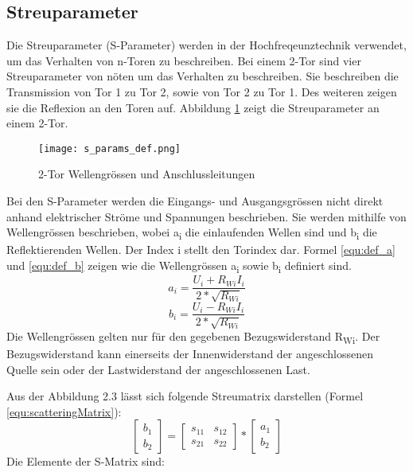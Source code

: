\subsection{Streuparameter}\label{subsec:Streuparameter}
Die Streuparameter (S-Parameter) werden in der Hochfreqeunztechnik verwendet, um das Verhalten von n-Toren zu beschreiben. Bei einem 2-Tor sind vier Streuparameter von nöten um das Verhalten zu beschreiben. Sie beschreiben die Transmission von Tor 1 zu Tor 2, sowie von Tor 2 zu Tor 1. Des weiteren zeigen sie die Reflexion an den Toren auf. Abbildung \ref{fig:2-Tor}  zeigt die Streuparameter an einem 2-Tor. 
\begin{figure}[H]
	\centering
	\texttt{[image: s\_params\_def.png]}
	\caption{2-Tor Wellengrössen und Anschlussleitungen \cite{hftech}}
	\label{fig:2-Tor}
\end{figure}
Bei den S-Parameter werden die Eingangs- und Ausgangsgrössen nicht direkt anhand elektrischer Ströme und Spannungen beschrieben. Sie werden mithilfe von Wellengrössen beschrieben, wobei a\textsubscript{i} die einlaufenden Wellen sind und b\textsubscript{i} die Reflektierenden Wellen. Der Index i stellt den Torindex dar. Formel \ref{equ:def_a} und \ref{equ:def_b} zeigen wie die Wellengrössen a\textsubscript{i} sowie b\textsubscript{i} definiert sind.
\begin{equation}\label{equ:def_a}
	a_{ i } = \frac{ U_{ i}+R_{ Wi }I_{ i }}{2*\sqrt{ R_{ Wi } }}
\end{equation}
\begin{equation}\label{equ:def_b}
	b_{ i } = \frac{ U_{ i}-R_{ Wi }I_{ i }}{2*\sqrt{ R_{ Wi } }}
\end{equation}
Die Wellengrössen gelten nur für den gegebenen Bezugswiderstand R\textsubscript{Wi}. Der Bezugswiderstand kann einerseits der Innenwiderstand der angeschlossenen Quelle sein oder der Lastwiderstand der angeschlossenen Last.

Aus der Abbildung 2.3 lässt sich folgende Streumatrix darstellen (Formel \ref{equ:scatteringMatrix}):
\begin{equation}\label{equ:scatteringMatrix}
	\left[
		\begin{matrix}b_1 \\ b_2 \end{matrix}
	\right]
 	=
 	\left[
 		\begin{matrix}
			s_{11}&s_{12} \\s_{21}&s_{22}
		\end{matrix}
	\right]
	* 
	\left[
		\begin{matrix}
			a_1\\b_2
		\end{matrix}
	\right]
\end{equation}
Die Elemente der S-Matrix sind:

